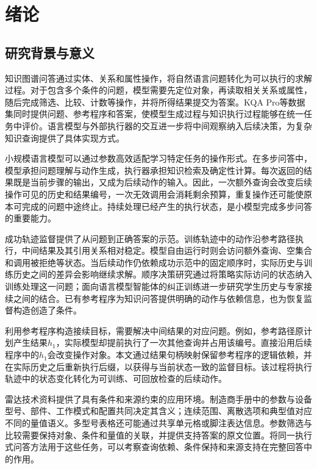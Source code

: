 \chapter{绪论}
\label{chap:introduction}

\section{研究背景与意义}

知识图谱问答通过实体、关系和属性操作，将自然语言问题转化为可以执行的求解过程。对于包含多个条件的问题，模型需要先定位对象，再读取相关关系或属性，随后完成筛选、比较、计数等操作，并将所得结果提交为答案。KQA Pro等数据集同时提供问题、参考程序和答案，使模型生成过程与知识执行过程能够在统一任务中评价\cite{cao2022kqapro}。语言模型与外部执行器的交互进一步将中间观察纳入后续决策，为复杂知识查询提供了具体实现方式\cite{yao2023react}。

小规模语言模型可以通过参数高效适配学习特定任务的操作形式\cite{qwen2024qwen25,hu2022lora}。在多步问答中，模型承担问题理解与动作生成，执行器承担知识检索及确定性计算。每次返回的结果既是当前步骤的输出，又成为后续动作的输入。因此，一次额外查询会改变后续操作可见的历史和结果编号，一次无效调用会消耗剩余预算，重复操作还可能使原本可完成的问题中途终止。持续处理已经产生的执行状态，是小模型完成多步问答的重要能力。

成功轨迹监督提供了从问题到正确答案的示范。训练轨迹中的动作沿参考路径执行，中间结果及其引用关系相对稳定。模型自由运行时则会访问额外查询、空集合和调用被拒绝等状态。当后续动作仍依赖成功示范中的固定顺序时，实际历史与训练历史之间的差异会影响继续求解。顺序决策研究通过将策略实际访问的状态纳入训练处理这一问题\cite{ross2011dagger}；面向语言模型智能体的纠正训练进一步研究学生历史与专家接续之间的结合。已有参考程序为知识问答提供明确的动作与依赖信息，也为恢复监督构造创造了条件。

利用参考程序构造接续目标，需要解决中间结果的对应问题。例如，参考路径原计划产生结果$h_1$，实际模型却提前执行了一次其他查询并占用该编号。直接沿用后续程序中的$h_1$会改变操作对象。本文通过结果句柄映射保留参考程序的逻辑依赖，并在实际历史之后重新执行后缀，以获得与当前状态一致的监督目标。该过程将执行轨迹中的状态变化转化为可训练、可回放检查的后续动作。

雷达技术资料提供了具有条件和来源约束的应用环境。制造商手册中的参数与设备型号、部件、工作模式和配置共同决定其含义；连续范围、离散选项和典型值对应不同的量值语义。多型号表格还可能通过共享单元格或脚注表达信息。参数筛选与比较需要保持对象、条件和量值的关联，并提供支持答案的原文位置。将同一执行式问答方法用于这些任务，可以考察查询依赖、条件保持和来源支持在完整回答中的作用。


